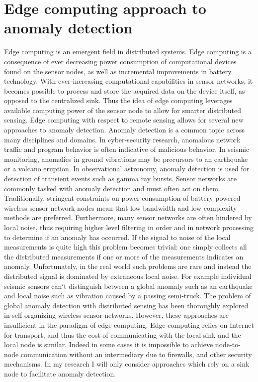 \section{Edge computing approach to anomaly detection}\label{intro:edge}
Edge computing is an emergent field in distributed systems. Edge computing is a consequence of ever decreasing power consumption of computational devices found on the sensor nodes, as well as incremental improvements in battery technology. With ever-increasing computational capabilities in sensor networks, it becomes possible to process and store the acquired data on the device itself, as opposed to the centralized sink. Thus the idea of edge computing leverages available computing power of the sensor node to allow for smarter distributed sensing. Edge computing with respect to remote sensing allows for several new approaches to anomaly detection. Anomaly detection is a common topic across many disciplines and domains. In cyber-security research, anomalous network traffic and program behavior is often indicative of malicious behavior. In seismic monitoring, anomalies in ground vibrations may be precursors to an earthquake or a volcano eruption. In observational astronomy, anomaly detection is used for detection of transient events such as gamma ray bursts. Sensor networks are commonly tasked with anomaly detection and must often act on them. Traditionally, stringent constraints on power consumption of battery powered wireless sensor network nodes mean that low bandwidth and low complexity methods are preferred. Furthermore, many sensor networks are often hindered by local noise, thus requiring higher level filtering in order and in network processing to determine if an anomaly has occurred. If the signal to noise of the local measurements is quite high this problem becomes trivial: one simply collects all the distributed measurements if one or more of the measurements indicates an anomaly. Unfortunately, in the real world such problems are rare and instead the distributed signal is dominated by extraneous local noise. For example individual seismic sensors can`t distinguish between a global anomaly such as an earthquake and local noise such as vibration caused by a passing semi-truck. The problem of global anomaly detection with distributed sensing has been thoroughly explored in self organizing wireless sensor networks. However, these approaches are insufficient in the paradigm of edge computing. Edge computing relies on Internet for transport, and thus the cost of communicating with the local sink and the local node is similar. Indeed in some cases it is impossible to achieve node-to-node communication without an intermediary due to firewalls, and other security mechanisms. In my research I will only consider approaches which rely on a sink node to facilitate anomaly detection.


